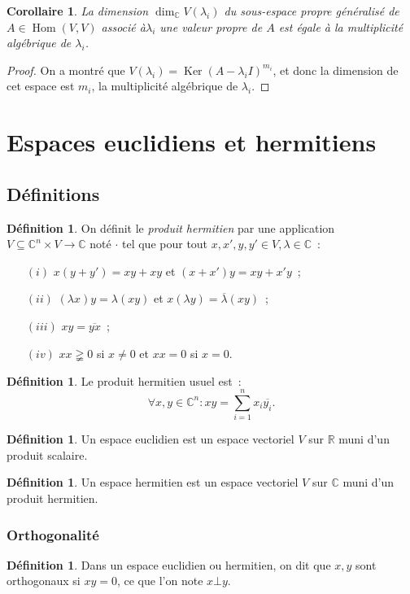 \documentclass{article}
\DeclareMathOperator{\Ker}{Ker}
\DeclareMathOperator{\Hom}{Hom}
\newcommand{\R}{\mathbb R}
\newcommand{\C}{\mathbb C}
\newcommand{\conj}[1]{\overline {#1}}
\newtheorem{cor}[thm]{Corollaire}
\theoremstyle{definition}
\newtheorem{déf}[thm]{Définition}
\theoremstyle{remark}
\begin{document}
		\begin{cor} La dimension $\dim_\C V(\lambda_i)$ du sous-espace propre généralisé de $A \in \Hom(V, V)$ associé à$\lambda_i$ une valeur propre de $A$
		est égale à la multiplicité algébrique de $\lambda_i$.
		\end{cor}

		\begin{proof} On a montré que $V(\lambda_i) = \Ker(A-\lambda_i I)^{m_i}$, et donc la dimension de cet espace est $m_i$, la multiplicité algébrique de
		$\lambda_i$.
		\end{proof}

\newpage
\section{Espaces euclidiens et hermitiens}
	\subsection{Définitions}
		\begin{déf} On définit le \emph{produit hermitien} par une application $V \subseteq \C^n \times V \to \C$ noté $\cdot$ tel que pour tout
		$x, x', y, y' \in V, \lambda \in \C$~:
		\begin{itemize}
			\item[$(i)$]   $x(y+y') = xy + xy$ et $(x+x')y = xy + x'y$~;
			\item[$(ii)$]  $(\lambda x)y = \lambda(xy)$ et $x(\lambda y) = \conj \lambda(xy)$~;
			\item[$(iii)$] $xy = \conj {yx}$~;
			\item[$(iv)$]  $xx \gneqq 0$ si $x \neq 0$ et $xx = 0$ si $x = 0$.
		\end{itemize}
		\end{déf}

		\begin{déf} Le produit hermitien usuel est~:
		\[\forall x, y \in \C^n : xy = \sum_{i=1}^nx_i\conj {y_i}.\]
		\end{déf}

		\begin{déf} Un espace euclidien est un espace vectoriel $V$ sur $\R$ muni d'un produit scalaire.
		\end{déf}

		\begin{déf} Un espace hermitien est un espace vectoriel $V$ sur $\C$ muni d'un produit hermitien.
		\end{déf}

		\subsubsection{Orthogonalité}
		\begin{déf} Dans un espace euclidien ou hermitien, on dit que $x, y$ sont orthogonaux si $xy = 0$, ce que l'on note $x \bot y$.
		\end{déf}
\end{document}
